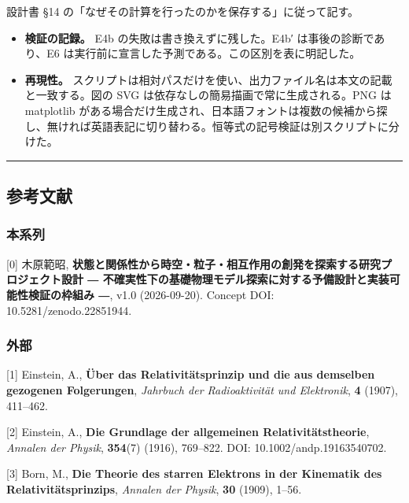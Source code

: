 \documentclass[
  a4paper,
]{ltjsarticle}
\providecommand{\tightlist}{%
  \setlength{\itemsep}{0pt}\setlength{\parskip}{0pt}}
\begin{document}
設計書 §14 の「なぜその計算を行ったのかを保存する」に従って記す。

\begin{itemize}
\tightlist
\item
  \textbf{検証の記録。} E4b の失敗は書き換えずに残した。E4b′
  は事後の診断であり、E6
  は実行前に宣言した予測である。この区別を表に明記した。
\item
  \textbf{再現性。}
  スクリプトは相対パスだけを使い、出力ファイル名は本文の記載と一致する。図の
  SVG は依存なしの簡易描画で常に生成される。PNG は matplotlib
  がある場合だけ生成され、日本語フォントは複数の候補から探し、無ければ英語表記に切り替わる。恒等式の記号検証は別スクリプトに分けた。
\end{itemize}

\begin{center}\rule{0.5\linewidth}{0.5pt}\end{center}

\subsection{参考文献}\label{ux53c2ux8003ux6587ux732e}

\subsubsection{本系列}\label{ux672cux7cfbux5217}

{[}0{]} 木原範昭,
\textbf{状態と関係性から時空・粒子・相互作用の創発を探索する研究プロジェクト設計
― 不確実性下の基礎物理モデル探索に対する予備設計と実装可能性検証の枠組み
―}, v1.0 (2026-09-20). Concept DOI: 10.5281/zenodo.22851944.

\subsubsection{外部}\label{ux5916ux90e8}

{[}1{]} Einstein, A., \textbf{Über das Relativitätsprinzip und die aus
demselben gezogenen Folgerungen}, \emph{Jahrbuch der Radioaktivität und
Elektronik}, \textbf{4} (1907), 411--462.

{[}2{]} Einstein, A., \textbf{Die Grundlage der allgemeinen
Relativitätstheorie}, \emph{Annalen der Physik}, \textbf{354}(7) (1916),
769--822. DOI: 10.1002/andp.19163540702.

{[}3{]} Born, M., \textbf{Die Theorie des starren Elektrons in der
Kinematik des Relativitätsprinzips}, \emph{Annalen der Physik},
\textbf{30} (1909), 1--56.
\end{document}

